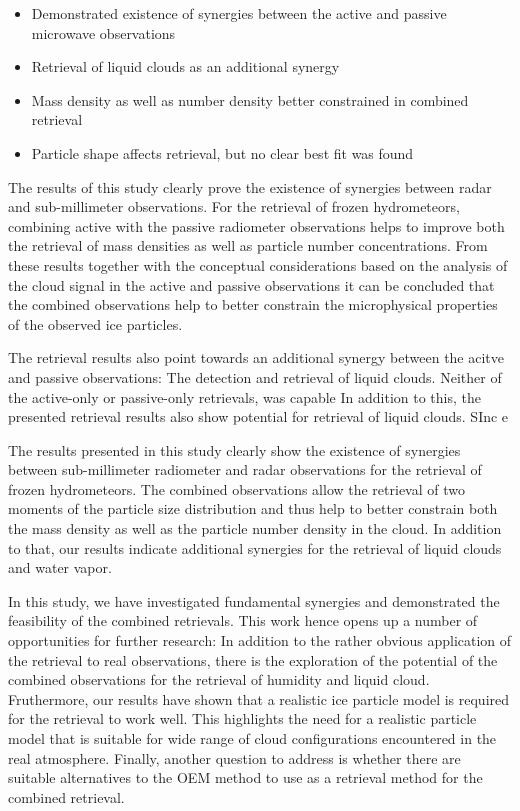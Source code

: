 \documentclass[journal abbreviation, manuscript]{copernicus}
\begin{document}
\conclusions  %
\label{sec:conclusions}

\begin{itemize}
  \item Demonstrated existence of synergies between the active and passive
  microwave observations
  \item Retrieval of liquid clouds as an additional synergy
  \item Mass density as well as number density better constrained in combined
  retrieval
  \item Particle shape affects retrieval, but no clear best fit was found
\end{itemize}

The results of this study clearly prove the existence of synergies between radar
and sub-millimeter observations. For the retrieval of frozen hydrometeors,
combining active with the passive radiometer observations helps to improve both
the retrieval of mass densities as well as particle number concentrations.
From these results together with the conceptual considerations based on the
analysis of the cloud signal in the active and passive observations it can be
concluded that the combined observations help to better constrain the
microphysical properties of the observed ice particles.

The retrieval results also point towards an additional synergy between the
acitve and passive observations: The detection and retrieval of liquid clouds.
Neither of the active-only or passive-only retrievals,  was capable
In addition to this, the presented retrieval results also show potential for retrieval of liquid clouds. SInc e


  
The results presented in this study clearly show the existence of synergies
between sub-millimeter radiometer and radar observations for the retrieval of
frozen hydrometeors. The combined observations allow the retrieval of two
moments of the particle size distribution and thus help to better constrain
both the mass density as well as the particle number density in the cloud.
In addition to that, our results indicate additional synergies for the retrieval
of liquid clouds and water vapor.

In this study, we have investigated fundamental synergies and demonstrated the
feasibility of the combined retrievals. This work hence opens up a number of
opportunities for further research: In addition to the rather obvious
application of the retrieval to real observations, there is the exploration of
the potential of the combined observations for the retrieval of humidity and
liquid cloud. Fruthermore, our results have shown that a realistic ice particle
model is required for the retrieval to work well. This highlights the need for a
realistic particle model that is suitable for wide range of cloud configurations
encountered in the real atmosphere. Finally, another question to address is
whether there are suitable alternatives to the OEM method to use as a retrieval
method for the combined retrieval.
\end{document}
